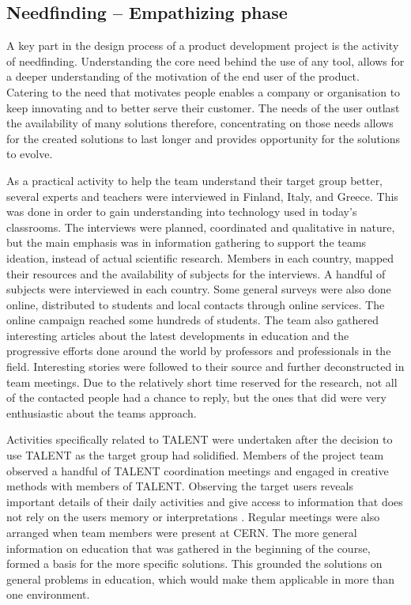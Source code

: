 \documentclass[english,12pt,a4paper,pdftex]{article}
\begin{document}

\subsection{Needfinding -- Empathizing phase}

A key part in the design process of a product development project is the activity of needfinding. Understanding the core need behind the use of any tool, allows for a deeper understanding of the motivation of the end user of the product. Catering to the need that motivates people enables a company or organisation to keep innovating and to better serve their customer. The needs of the user outlast the availability of many solutions therefore, concentrating on those needs allows for the created solutions to last longer and provides opportunity for the solutions to evolve. \cite{Patnaik} 

As a practical activity to help the team understand their target group better, several experts and teachers were interviewed in Finland, Italy, and Greece. This was done in order to gain understanding into technology used in today's classrooms. The interviews were planned, coordinated and qualitative in nature, but the main emphasis was in information gathering to support the teams ideation, instead of actual scientific research. Members in each country, mapped their resources and the availability of subjects for the interviews. A handful of subjects were interviewed in each country. Some general surveys were also done online, distributed to students and local contacts through online services. The online campaign reached some hundreds of students. The team also gathered interesting articles about the latest developments in education and the progressive efforts done around the world by professors and professionals in the field. Interesting stories were followed to their source and further deconstructed in team meetings. Due to the relatively short time reserved for the research, not all of the contacted people had a chance to reply, but the ones that did were very enthusiastic about the teams approach. 

Activities specifically related to TALENT were undertaken after the decision to use TALENT as the target group had solidified. Members of the project team observed a handful of TALENT coordination meetings and engaged in creative methods with members of TALENT. Observing the target users reveals important details of their daily activities and give access to information that does not rely on the users memory or interpretations \cite{Patnaik}. Regular meetings were also arranged when team members were present at CERN. The more general information on education that was gathered in the beginning of the course, formed a basis for the more specific solutions. This grounded the solutions on general problems in education, which would make them applicable in more than one environment.
\end{document}
